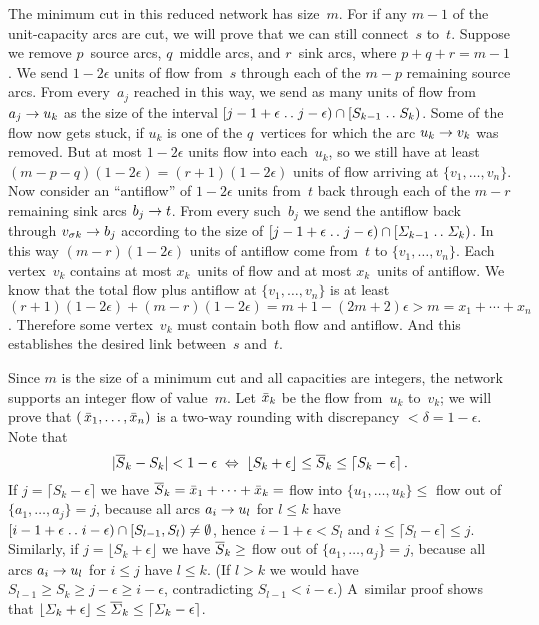 The minimum cut in this reduced network has size~$m$. For if any $m-1$ of the
unit-capacity arcs are cut, we will prove that we can still connect~$s$ to~$t$.
Suppose we remove $p$~source arcs, $q$~middle arcs, and $r$~sink arcs, where
$p+q+r=m-1$. We send $1-2\epsilon$ units of flow from~$s$ through each of the
$m-p$ remaining source arcs. From every~$a_j$ reached in this way, we send as
many units of flow from $a_j\rightarrow u_k$ as the size of the interval 
$[j-1+\epsilon\mathrel{.\,.} j-\epsilon)\cap [S_{k-1}\mathrel{.\,.} S_k)$. Some of the flow now
gets stuck, if $u_k$ is one of the $q$~vertices for which the arc
$u_k\rightarrow v_k$ was removed. But at most $1-2\epsilon$ units flow into
each~$u_k$, so we still have at least $(m-p-q)(1-2\epsilon)=(r+1)(1-2\epsilon)$
units of flow arriving at $\{v_1,\ldots,v_n\}$. Now consider an ``antiflow'' of
$1-2\epsilon$ units from~$t$ back through each of the $m-r$ remaining sink
arcs $b_j\rightarrow t$. From every such~$b_j$ we send the antiflow back through
$v_{\sigma k}\rightarrow b_j$ according to the size of $[j-1+\epsilon\mathrel{.\,.}
j-\epsilon)\cap [{\mit\Sigma}_{k-1}\mathrel{.\,.} {\mit\Sigma}_k)$. In this way
$(m-r)(1-2\epsilon)$ units of antiflow come from~$t$ to $\{v_1,\ldots,v_n\}$.
Each vertex~$v_k$ contains at most $x_k$~units of flow and at most $x_k$~units
of antiflow. We know that the total flow plus antiflow at $\{v_1,\ldots,v_n\}$
is at least $(r+1)(1-2\epsilon)+(m-r)(1-2\epsilon)=m+1-(2m+2)\epsilon
>m=x_1+\cdots+x_n$. Therefore some vertex~$v_k$ must contain both flow and
antiflow. And this establishes the desired link between~$s$ and~$t$.

Since $m$ is the size of a minimum cut and all capacities are integers, the
network supports an integer flow of value~$m$. Let ${\bar{x}}_k$ be the flow
from~$u_k$ to~$v_k$; we will prove that
$(\,{\bar{x}}_1,\ldots,{\bar{x}}_n)$ is a two-way rounding with discrepancy
$<\delta=1-\epsilon$. Note that
$$\vert{\overline S}_k-S_k\vert< 1-\epsilon\;\Leftrightarrow\;
\lfloor S_k+\epsilon\rfloor\leq{\overline S}_k\leq\lceil S_k-\epsilon\rceil\,.$$
If $j=\lceil S_k-\epsilon\rceil$ we have
${\overline S}_k={\bar{x}}_1+\cdots+{\bar{x}}_k=$ flow into $\{u_1,\ldots,u_k\}\leq$ flow out
of $\{a_1,\ldots,a_j\}=j$, because all arcs $a_i\rightarrow u_l$ for $l\leq k$ have
$[i-1+\epsilon\mathrel{.\,.} i-\epsilon)\cap[S_{l-1},S_l)\neq\emptyset$, hence
$i-1+\epsilon< S_l$ and $i\leq \lceil S_l-\epsilon\rceil\leq j$. Similarly,
if $j=\lfloor S_k+\epsilon\rfloor$ we have ${\overline S}_k\geq$ flow out of
$\{a_1,\ldots,a_j\}=j$, because all arcs $a_i\rightarrow u_l$ for $i\leq j$ have
$l\leq k$. (If $l> k$ we would have $S_{l-1}\geq S_k\geq j-\epsilon\geq
i-\epsilon$, contradicting $S_{l-1}< i-\epsilon$.) A~similar proof shows 
that $\lfloor{\mit\Sigma}_k+\epsilon\rfloor
\leq{\overline{{\mit\Sigma}}}_k\leq\lceil{\mit\Sigma}_k-\epsilon\rceil$.\ \pfbox

